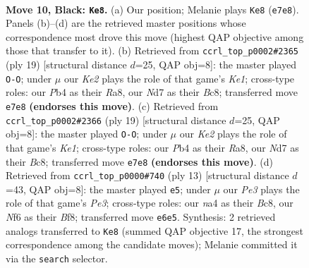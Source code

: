 \documentclass[11pt]{article}
\begin{document}
\clearpage

\begin{figure}[p]\centering
\begin{subfigure}{0.46\textwidth}\centering
\resizebox{\linewidth}{!}{%
\newchessgame
\chessboard[
  setfen={r1bq1b1r/p2nkppp/2p1pn2/8/Np1P4/4PN2/PP2BPPP/R1BQ1RK1 b - - 1 10},
  showmover=false,
  pgfstyle=straightmove, color=movearrow, markmove={e7-e8}
]}
\caption{}
\end{subfigure}\hfill
\begin{subfigure}{0.46\textwidth}\centering
\resizebox{\linewidth}{!}{%
\newchessgame
\chessboard[
  setfen={r1bqk2r/p2nbppp/2p1pn2/8/Np1P4/4PN2/PP2BPPP/R1BQ1RK1 b kq - 3 10},
  showmover=false,
  pgfstyle=straightmove, color=movearrow, markmove={e8-g8}
]}
\caption{}
\end{subfigure}
\\[4pt]
\begin{subfigure}{0.46\textwidth}\centering
\resizebox{\linewidth}{!}{%
\newchessgame
\chessboard[
  setfen={r1bqk2r/p2nbppp/2p1pn2/8/Np1P4/4PN2/PP2BPPP/R1BQ1RK1 b kq - 3 10},
  showmover=false,
  pgfstyle=straightmove, color=movearrow, markmove={e8-g8}
]}
\caption{}
\end{subfigure}\hfill
\begin{subfigure}{0.46\textwidth}\centering
\resizebox{\linewidth}{!}{%
\newchessgame
\chessboard[
  setfen={r1bqkb1r/pp1n1ppp/2p1pn2/8/2P5/2N1PN2/PB1P1PPP/R2QKB1R b KQkq - 0 7},
  showmover=false,
  pgfstyle=straightmove, color=movearrow, markmove={e6-e5}
]}
\caption{}
\end{subfigure}
\caption{\textbf{Move 10, Black: \texttt{Ke8}.} (a) Our position; Melanie plays \texttt{Ke8} (\texttt{e7e8}). Panels (b)--(d) are the retrieved master positions whose correspondence most drove this move (highest QAP objective among those that transfer to it). (b) Retrieved from \texttt{ccrl\_top\_p0002\#2365} (ply 19) [structural distance $d$=25, QAP obj=8]: the master played \texttt{O-O}; under $\mu$ our \emph{Ke2} plays the role of that game's \emph{Ke1}; cross-type roles: our \emph{P}b4 as their \emph{R}a8, our \emph{N}d7 as their \emph{B}c8; transferred move \texttt{e7e8} \textbf{(endorses this move)}. (c) Retrieved from \texttt{ccrl\_top\_p0002\#2366} (ply 19) [structural distance $d$=25, QAP obj=8]: the master played \texttt{O-O}; under $\mu$ our \emph{Ke2} plays the role of that game's \emph{Ke1}; cross-type roles: our \emph{P}b4 as their \emph{R}a8, our \emph{N}d7 as their \emph{B}c8; transferred move \texttt{e7e8} \textbf{(endorses this move)}. (d) Retrieved from \texttt{ccrl\_top\_p0000\#740} (ply 13) [structural distance $d$=43, QAP obj=8]: the master played \texttt{e5}; under $\mu$ our \emph{Pe3} plays the role of that game's \emph{Pe3}; cross-type roles: our \emph{n}a4 as their \emph{B}c8, our \emph{N}f6 as their \emph{B}f8; transferred move \texttt{e6e5}. Synthesis: 2 retrieved analogs transferred to \texttt{Ke8} (summed QAP objective 17, the strongest correspondence among the candidate moves); Melanie committed it via the \texttt{search} selector.}
\label{fig:thought-m19}
\end{figure}
\end{document}
